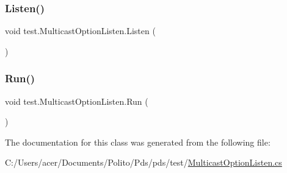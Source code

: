 \subsubsection{\texorpdfstring{Listen()}{Listen()}}
{\footnotesize\ttfamily void test.\+Multicast\+Option\+Listen.\+Listen (\begin{DoxyParamCaption}{ }\end{DoxyParamCaption})}

\mbox{\label{classtest_1_1_multicast_option_listen_afe9f8040b3198b5923c61089804e82e7}} 
\subsubsection{\texorpdfstring{Run()}{Run()}}
{\footnotesize\ttfamily void test.\+Multicast\+Option\+Listen.\+Run (\begin{DoxyParamCaption}{ }\end{DoxyParamCaption})}



The documentation for this class was generated from the following file\+:\begin{DoxyCompactItemize}
\item 
C\+:/\+Users/acer/\+Documents/\+Polito/\+Pds/pds/test/\hyperlink{_multicast_option_listen_8cs}{Multicast\+Option\+Listen.\+cs}\end{DoxyCompactItemize}
